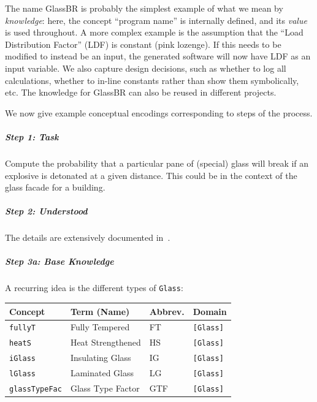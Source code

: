 \documentclass[a4paper,UKenglish,cleveref,autoref,thm-restate]{oasics-v2021}
\begin{document}
The name GlassBR is probably the simplest example of what we mean by
\emph{knowledge}: here, the concept ``program name'' is internally defined, and
its \emph{value} is used throughout. A more complex example is the assumption
that the ``Load Distribution Factor'' (LDF) is constant (pink lozenge). If this
needs to be modified to instead be an input, the generated software will now
have LDF as an input variable.  We also capture design decisions, such as
whether to log all calculations, whether to in-line constants rather than show
them symbolically, etc. The knowledge for GlassBR can also be reused in
different projects.

We now give example conceptual encodings corresponding to steps of the process.

\subparagraph*{Step 1: Task} Compute the probability that a particular pane of
(special) glass will break if an explosive is detonated at a given distance.
This could be in the context of the glass facade for a building.

\subparagraph*{Step 2: Understood} The details are extensively documented
in~\cite{BeasonEtAl1998, ASTM2009, ASTM2015}.

\subparagraph*{Step 3a: Base Knowledge}
A recurring idea is the different types of \texttt{Glass}:
\begin{center}
  \begin{tabular}{|l|l|l|l|}
    \hline
    \textbf{Concept} & \textbf{Term (Name)} & \textbf{Abbrev.} & \textbf{Domain} \\ \hline
    \texttt{fullyT} & Fully Tempered & FT & \texttt{[Glass]} \\ \hline
    \texttt{heatS} & Heat Strengthened & HS & \texttt{[Glass]} \\ \hline
    \texttt{iGlass} & Insulating Glass & IG & \texttt{[Glass]} \\ \hline
    \texttt{lGlass} & Laminated Glass & LG & \texttt{[Glass]} \\ \hline
    \texttt{glassTypeFac} & Glass Type Factor & GTF & \texttt{[Glass]} \\ \hline
  \end{tabular}
\end{center}
\end{document}

